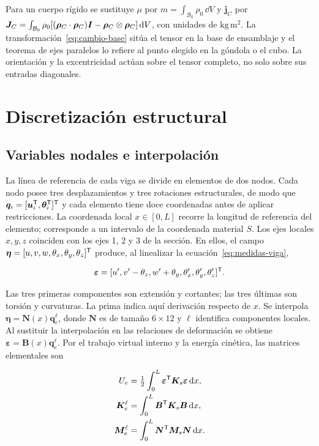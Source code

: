 Para un cuerpo rígido se sustituye $\mu$ por $m=\int_{\mathcal B_0}\rho_0\,\dd V$ y $\bm j_C$ por $\bm J_C=\int_{\mathcal B_0}\rho_0[(\bm\rho_C\cdot\bm\rho_C)\bm I-\bm\rho_C\otimes\bm\rho_C]\,\mathrm d V$, con unidades de $\mathrm{kg\,m^2}$. La transformación~\eqref{eq:cambio-base} sitúa el tensor en la base de ensamblaje y el teorema de ejes paralelos lo refiere al punto elegido en la góndola o el cubo. La orientación y la excentricidad actúan sobre el tensor completo, no solo sobre sus entradas diagonales.

\section{Discretización estructural}
\label{sec:elementos}
\subsection{Variables nodales e interpolación}
La línea de referencia de cada viga se divide en elementos de dos nodos. Cada nodo posee tres desplazamientos y tres rotaciones estructurales, de modo que
$\bm q_i=[\bm u_i^\mathsf T,\bm\theta_i^\mathsf T]^\mathsf T$ y cada elemento tiene doce coordenadas antes de aplicar restricciones. La coordenada local $x\in[0,L]$ recorre la longitud de referencia del elemento; corresponde a un intervalo de la coordenada material $S$. Los ejes locales $x,y,z$ coinciden con los ejes 1, 2 y 3 de la sección. En ellos, el campo
$\bm\eta=[u,v,w,\theta_x,\theta_y,\theta_z]^\mathsf T$
produce, al linealizar la ecuación~\eqref{eq:medidas-viga},

\begin{equation}
\bm\varepsilon=[u',v'-\theta_z,w'+\theta_y,
\theta_x',\theta_y',\theta_z']^\mathsf T.
\end{equation}

Las tres primeras componentes son extensión y cortantes; las tres últimas son torsión y curvaturas. La prima indica aquí derivación respecto de $x$. Se interpola $\bm\eta=\bm N(x)\bm q_e^\ell$, donde $\bm N$ es de tamaño $6\times12$ y $\ell$ identifica componentes locales. Al sustituir la interpolación en las relaciones de deformación se obtiene $\bm\varepsilon=\bm B(x)\bm q_e^\ell$. Por el trabajo virtual interno y la energía cinética, las matrices elementales son

\begin{align}
U_e&=\tfrac12\int_0^L\bm\varepsilon^\mathsf T\bm K_s\bm\varepsilon\,\mathrm d x,\nonumber\\
\bm K_e^\ell&=\int_0^L\bm B^\mathsf T\bm K_s\bm B\,\mathrm d x,\nonumber\\
\bm M_e^\ell&=\int_0^L\bm N^\mathsf T\bm M_s\bm N\,\mathrm d x.
\label{eq:elementenergy}
\end{align}

